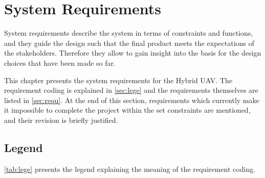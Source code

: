 \chapter{System Requirements}
\setlength{\parindent}{15pt}
\label{ch:tech_requ}

System requirements describe the system in terms of constraints and functions, and they guide the design such that the final product meets the expectations of the stakeholders. Therefore they allow to gain insight into the basis for the design choices that have been made so far.

This chapter presents the system requirements for the Hybrid UAV. The requirement coding is explained in \autoref{sec:lege} and the requirements themselves are listed in \autoref{sec:requ}. At the end of this section, requirements which currently make it impossible to complete the project within the set constraints are mentioned, and their revision is briefly justified.

\section{Legend}
\label{sec:lege}

\autoref{tab:lege} presents the legend explaining the meaning of the requirement coding.

